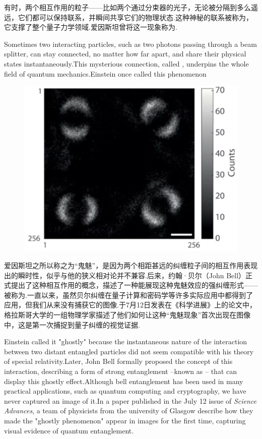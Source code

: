 

\begin{multicols}{2}

有时，两个相互作用的粒子——比如两个通过分束器的光子，无论被分隔到多么遥远，它们都可以保持联系，并瞬间共享它们的物理状态.这种神秘的联系被称为，它支撑了整个量子力学领域.爱因斯坦曾将这一现象称为.

Sometimes two interacting particles, such as two photons passing through a beam splitter, can stay connected, no matter how far apart, and share their physical states instantaneously.This mysterious connection, called , underpins the whole field of quantum mechanics.Einstein once called this phenomenon 

\begin{figure}[H]
    \centering
    \includegraphics[width=0.7\linewidth]{Interstellar/IMG/201907/01.jpg}
    \caption{}
    
\end{figure}

爱因斯坦之所以称之为“鬼魅”，是因为两个相距甚远的纠缠粒子间的相互作用表现出的瞬时性，似乎与他的狭义相对论并不兼容.后来，约翰·贝尔（John Bell）正式提出了这种相互作用的概念，描述了一种能展现这种鬼魅效应的强纠缠形式——被称为.一直以来，虽然贝尔纠缠在量子计算和密码学等许多实际应用中都得到了应用，但我们从来没有捕获它的图像.于7月12日发表在《科学进展》上的论文中，格拉斯哥大学的一组物理学家描述了他们如何让这种“鬼魅现象”首次出现在图像中，这是第一次捕捉到量子纠缠的视觉证据.

Einstein called it "ghostly" because the instantaneous nature of the interaction between two distant entangled particles did not seem compatible with his theory of special relativity.Later, John Bell formally proposed the concept of this  interaction, describing a form of strong entanglement --known as  -- that can display this ghostly effect.Although bell entanglement has been used in many practical applications, such as quantum computing and cryptography, we have never captured an image of it.In a paper published in the July 12 issue of \textit{Science Advances}\/, a team of physicists from the university of Glasgow describe how they made the "ghostly phenomenon" appear in images for the first time, capturing visual evidence of quantum entanglement.


\end{multicols}
